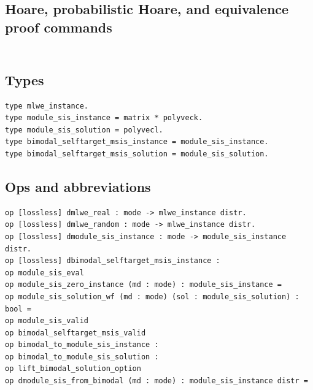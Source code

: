 \subsection*{Hoare, probabilistic Hoare, and equivalence proof commands}
\begin{lstlisting}[language=EasyCrypt,basicstyle=\ttfamily\tiny]
\end{lstlisting}

\section*{}

\subsection*{Types}
\begin{lstlisting}[language=EasyCrypt,basicstyle=\ttfamily\tiny]
type mlwe_instance.
type module_sis_instance = matrix * polyveck.
type module_sis_solution = polyvecl.
type bimodal_selftarget_msis_instance = module_sis_instance.
type bimodal_selftarget_msis_solution = module_sis_solution.
\end{lstlisting}

\subsection*{Ops and abbreviations}
\begin{lstlisting}[language=EasyCrypt,basicstyle=\ttfamily\tiny]
op [lossless] dmlwe_real : mode -> mlwe_instance distr.
op [lossless] dmlwe_random : mode -> mlwe_instance distr.
op [lossless] dmodule_sis_instance : mode -> module_sis_instance distr.
op [lossless] dbimodal_selftarget_msis_instance :
op module_sis_eval
op module_sis_zero_instance (md : mode) : module_sis_instance =
op module_sis_solution_wf (md : mode) (sol : module_sis_solution) : bool =
op module_sis_valid
op bimodal_selftarget_msis_valid
op bimodal_to_module_sis_instance :
op bimodal_to_module_sis_solution :
op lift_bimodal_solution_option
op dmodule_sis_from_bimodal (md : mode) : module_sis_instance distr =
\end{lstlisting}

